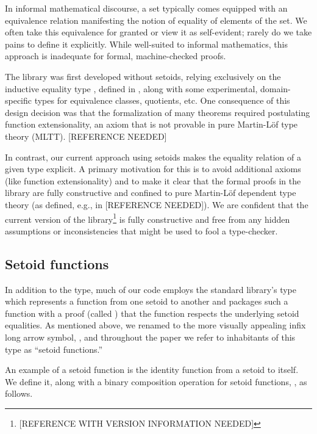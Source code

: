 In informal mathematical discourse, a set typically comes equipped with an equivalence
relation manifesting the notion of equality of elements of the set. We
often take this equivalence for granted or view it as self-evident; rarely do we
take pains to define it explicitly. While well-suited to informal
mathematics, this approach is inadequate for formal, machine-checked proofs.

The \agdaalgebras library was first developed without setoids, relying exclusively
on the inductive equality type , defined in ,
along with some experimental, domain-specific types for equivalence classes, quotients, etc.
One consequence of this design decision was that the formalization of many
theorems required postulating function extensionality, an axiom that is not provable
in pure Martin-Löf type theory (MLTT). [REFERENCE NEEDED]

In contrast, our current approach using setoids makes the equality relation
of a given type explicit.  A primary motivation for this is to avoid additional axioms
(like function extensionality) and to make it clear that the formal proofs in the
library are fully constructive and confined to pure Martin-Löf dependent type theory
(as defined, e.g., in [REFERENCE NEEDED]).
We are confident that the current version of the \agdaalgebras library\footnote{[REFERENCE
WITH VERSION INFORMATION NEEDED]} is fully constructive and free from any hidden
assumptions or inconsistencies that might be used to fool a type-checker.


\subsection{Setoid functions}
\label{setoid-functions}
In addition to the  type, much of our code employs the
standard library's  type which represents a function from one
setoid to another and packages such a function with a proof (called ) that
the function respects the underlying setoid equalities. As mentioned above, we renamed
 to the more visually appealing infix long arrow symbol,
, and  throughout the paper we
refer to inhabitants of this type as ``setoid functions.''

\ifshort\else
An example of a setoid function is the identity function from a setoid to itself.
We define it, along with a binary composition operation for setoid functions,
, as follows.

